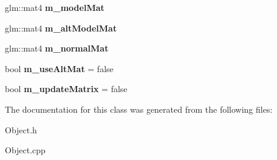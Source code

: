 \begin{DoxyCompactItemize}
\item 
\hypertarget{class_object_a63576ab555502bfb8de52e0f75b0d012}{}glm\+::mat4 {\bfseries m\+\_\+model\+Mat}\label{class_object_a63576ab555502bfb8de52e0f75b0d012}

\item 
\hypertarget{class_object_aa8ca8a51906713190326b0b2667d975e}{}glm\+::mat4 {\bfseries m\+\_\+alt\+Model\+Mat}\label{class_object_aa8ca8a51906713190326b0b2667d975e}

\item 
\hypertarget{class_object_af542c9ba8be80682203c4fe426eb071a}{}glm\+::mat4 {\bfseries m\+\_\+normal\+Mat}\label{class_object_af542c9ba8be80682203c4fe426eb071a}

\item 
\hypertarget{class_object_ac7370557bcc44f3054712733de22d9ee}{}bool {\bfseries m\+\_\+use\+Alt\+Mat} = false\label{class_object_ac7370557bcc44f3054712733de22d9ee}

\item 
\hypertarget{class_object_a4e7183f8631f7473e648138facdee129}{}bool {\bfseries m\+\_\+update\+Matrix} = false\label{class_object_a4e7183f8631f7473e648138facdee129}

\end{DoxyCompactItemize}


The documentation for this class was generated from the following files\+:\begin{DoxyCompactItemize}
\item 
Object.\+h\item 
Object.\+cpp\end{DoxyCompactItemize}
